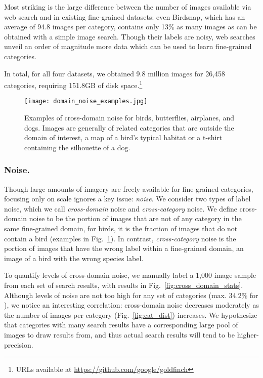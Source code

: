 \documentclass[runningheads]{llncs}
\begin{document}
Most striking is the large difference between the number of images available via web search and in existing fine-grained datasets: even Birdsnap, which has an average of 94.8 images per category, contains only 13\% as many images as can be obtained with a simple image search.
Though their labels are noisy, web searches unveil an order of magnitude more data which can be used to learn fine-grained categories.

In total, for all four datasets, we obtained 9.8 million images for 26,458 categories, requiring 151.8GB of disk space.\footnote{URLs available at \url{https://github.com/google/goldfinch}}



\begin{figure}[t]
\centering
\texttt{[image: domain\_noise\_examples.jpg]}
\caption{
Examples of cross-domain noise for birds, butterflies, airplanes, and dogs.
Images are generally of related categories that are outside the domain of interest, \eg a map of a bird's typical habitat or a t-shirt containing the silhouette of a dog.
}
\label{fig:domain_noise_examples}
\end{figure}

\subsubsection{Noise.}
Though large amounts of imagery are freely available for fine-grained categories, focusing only on scale ignores a key issue: \emph{noise}.
We consider two types of label noise, which we call \emph{cross-domain} noise and \emph{cross-category} noise.
We define cross-domain noise to be the portion of images that are not of any category in the same fine-grained domain, \ie for birds, it is the fraction of images that do not contain a bird (examples in Fig.~\ref{fig:domain_noise_examples}).
In contrast, \emph{cross-category} noise is the portion of images that have the wrong label within a fine-grained domain, \ie an image of a bird with the wrong species label.


To quantify levels of cross-domain noise, we manually label a 1,000 image sample from each set of search results, with results in Fig.~\ref{fig:cross_domain_stats}.
Although levels of noise are not too high for any set of categories (max. 34.2\% for \llep{}), we notice an interesting correlation: cross-domain noise decreases moderately as the number of images per category (Fig.~\ref{fig:cat_dist}) increases.
We hypothesize that categories with many search results have a corresponding large pool of images to draw results from, and thus actual search results will tend to be higher-precision.
\end{document}
